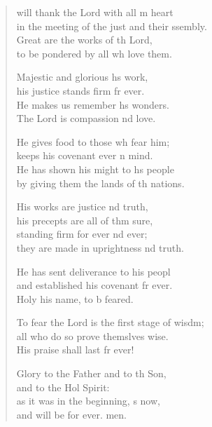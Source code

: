 \begin{verse}
  \begin{patverse}
 will thank the Lord with all m heart\Med\\
    in the meeting of the just and their ssembly.\\
Great are the works of th Lord,\Med\\
    to be pondered by all wh love them.

Majestic and glorious h\pointup{\i}s work,\Med\\
    his justice stands firm fr ever.\\
He makes us remember h\pointup{\i}s wonders.\Med\\
    The Lord is compassion nd love.

He gives food to those wh fear him;\Med\\
    keeps his covenant ever \pointup{\i}n mind.\\
He has shown his might to h\pointup{\i}s people\Med\\
    by giving them the lands of th nations.

His works are justice nd truth,\Med\\
    his precepts are all of thm sure,\\
standing firm for ever nd ever;\Med\\
    they are made in uprightness nd truth.

He has sent deliverance to his peopl\Flex\\
    and established his covenant fr ever.\Med\\
    Holy his name, to b feared.

To fear the Lord is the first stage of wisdm;\Flex\\
    all who do so prove themslves wise.\Med\\
His praise shall last fr ever!

Glory to the Father and to th Son,\Med\\
    and to the Hol Spirit:\\
as it was in the beginning, \pointup{\i}s now,\Med\\
    and will be for ever. men.
  \end{patverse}
\end{verse}
